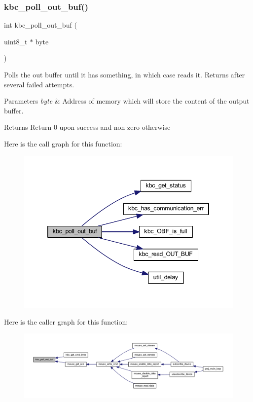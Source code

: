 \subsubsection{\texorpdfstring{kbc\+\_\+poll\+\_\+out\+\_\+buf()}{kbc\_poll\_out\_buf()}}
{\footnotesize\ttfamily int kbc\+\_\+poll\+\_\+out\+\_\+buf (\begin{DoxyParamCaption}\item[{uint8\+\_\+t $\ast$}]{byte }\end{DoxyParamCaption})}



Polls the out buffer until it has something, in which case reads it. Returns after several failed attempts. 


\begin{DoxyParams}{Parameters}
{\em byte} & Address of memory which will store the content of the output buffer. \\
\hline
\end{DoxyParams}
\begin{DoxyReturn}{Returns}
Return 0 upon success and non-\/zero otherwise 
\end{DoxyReturn}
Here is the call graph for this function\+:\nopagebreak
\begin{figure}[H]
\begin{center}
\leavevmode
\includegraphics[width=346pt]{group__keyboard_ga203a4c111fbe4b4fe6946a77bebbc171_cgraph}
\end{center}
\end{figure}
Here is the caller graph for this function\+:\nopagebreak
\begin{figure}[H]
\begin{center}
\leavevmode
\includegraphics[width=350pt]{group__keyboard_ga203a4c111fbe4b4fe6946a77bebbc171_icgraph}
\end{center}
\end{figure}
